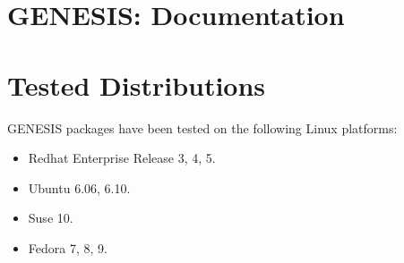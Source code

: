 \documentclass[12pt]{article}
\begin{document}
\section*{GENESIS: Documentation}

\section*{Tested Distributions}

GENESIS packages have been tested on the following Linux platforms:

\begin{itemize}
\item Redhat Enterprise Release 3, 4, 5.
\item Ubuntu 6.06, 6.10.
\item Suse 10.
\item Fedora 7, 8, 9.
\end{itemize}
\end{document}

